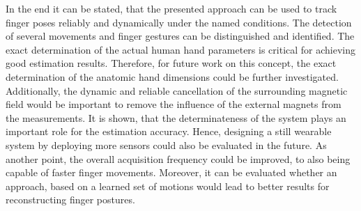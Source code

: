 In the end it can be stated, that the presented approach can be used to track finger poses reliably and dynamically under the named conditions. The detection of several movements and finger gestures can be distinguished and identified. The exact determination of the actual human hand parameters is critical for achieving good estimation results. Therefore, for future work on this concept, the exact determination of the anatomic hand dimensions could be further investigated. Additionally, the dynamic and reliable cancellation of the surrounding magnetic field would be important to remove the influence of the external magnets from the measurements. It is shown, that the determinateness of the system plays an important role for the estimation accuracy. Hence, designing a still wearable system by deploying more sensors could also be evaluated in the future. As another point, the overall acquisition frequency could be improved, to also being capable of faster finger movements. Moreover, it can be evaluated whether an approach, based on a learned set of motions would lead to better results for reconstructing finger postures.

 


